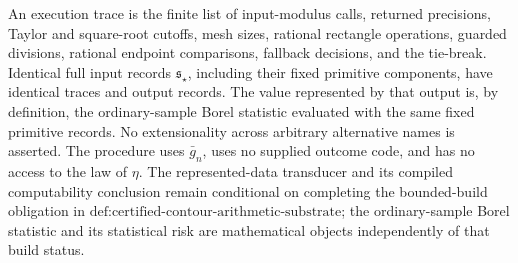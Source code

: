 An execution trace is the finite list of input-modulus calls, returned precisions, Taylor and square-root cutoffs, mesh sizes, rational rectangle operations, guarded divisions, rational endpoint comparisons, fallback decisions, and the tie-break.  Identical full input records \(\mathfrak s_{\star}\), including their fixed primitive components, have identical traces and output records.  The value represented by that output is, by definition, the ordinary-sample Borel statistic evaluated with the same fixed primitive records.  No extensionality across arbitrary alternative names is asserted.  The procedure uses \(\bar g_n\), uses no supplied outcome code, and has no access to the law of \(\eta\).  The represented-data transducer and its compiled computability conclusion remain conditional on completing the bounded-build obligation in \(\text{def:certified-contour-arithmetic-substrate}\); the ordinary-sample Borel statistic and its statistical risk are mathematical objects independently of that build status.